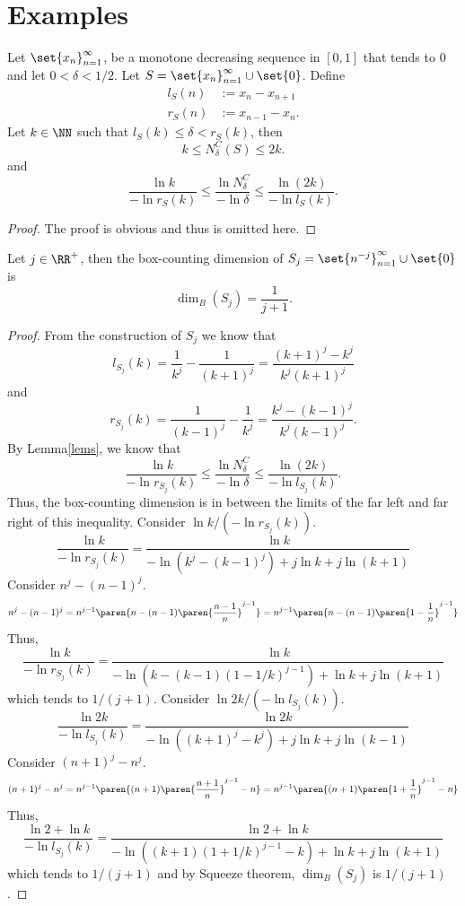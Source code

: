 \section{Examples}

\begin{lemma}\label{lems}
	Let $\set{x_n}_{n=1}^\infty$, be a monotone decreasing sequence in $[0,1]$ that tends to 0 and let $0 < \delta < 1/2$.
	Let $S=\set{x_n}_{n=1}^\infty\cup\set{0}$.
	Define
	\begin{align*}
		l_S(n)&:= x_n-x_{n+1}\\
		r_S(n)&:= x_{n-1}-x_n.
	\end{align*}
	Let $k\in\NN$ such that $l_S(k)\leq \delta < r_S(k)$, then
	\[
		k \leq N^C_\delta(S)\leq 2k.
	\]
	and
	\[
		\frac{\ln k}{-\ln r_S(k)}\leq \frac{\ln N^C_\delta}{-\ln\delta}\leq\frac{\ln (2k)}{-\ln l_S(k)}.
	\]
\end{lemma}
\begin{proof}
	The proof is obvious and thus is omitted here.
\end{proof}

\begin{example}
	Let $j\in\RR^+$, then the box-counting dimension of $S_j=\set{n^{-j}}_{n=1}^\infty\cup\set{0}$ is
	\[
		\dim_B(S_j)=\frac{1}{j+1}.
	\]
\end{example}
\begin{proof}
	From the construction of $S_j$ we know that
	\[
		l_{S_j}(k) = \frac{1}{k^j}-\frac{1}{(k+1)^j} = \frac{(k+1)^j-k^j}{k^j(k+1)^j}
	\]
	and
	\[
		r_{S_j}(k) = \frac{1}{(k-1)^j}-\frac{1}{k^j} = \frac{k^j-(k-1)^j}{k^j(k-1)^j}.
	\]
	By Lemma\autoref{lems}, we know that
	\[
		\frac{\ln k}{-\ln r_{S_j}(k)}\leq \frac{\ln N^C_\delta}{-\ln\delta}\leq\frac{\ln (2k)}{-\ln l_{S_j}(k)}.
	\]
	Thus, the box-counting dimension is in between the limits of the far left and far right of this inequality.
	Consider $\ln k/(-\ln r_{S_j}(k))$.
	\[
		\frac{\ln k}{-\ln r_{S_j}(k)}=\frac{\ln k}{-\ln (k^j-(k-1)^j)+j\ln k +j\ln(k+1)}
	\]
	Consider $n^j-(n-1)^j$.
	\[
		n^j-(n-1)^j=n^{j-1}\paren{ n - (n-1)\paren{\frac{n-1}{n}}^{j-1} }=n^{j-1}\paren{ n - (n-1)\paren{1-\frac{1}{n}}^{j-1} }
	\]
	Thus,
	\[
		\frac{\ln k}{-\ln r_{S_j}(k)}=\frac{\ln k}{-\ln(k-(k-1)(1-1/k)^{j-1})+\ln k +j\ln(k+1)}
	\]
	which tends to $1/(j+1)$.
	Consider $\ln 2k/(-\ln l_{S_j}(k))$.
	\[
		\frac{\ln 2k}{-\ln l_{S_j}(k)}=\frac{\ln 2k}{-\ln ((k+1)^j-k^j)+j\ln k +j\ln(k-1)}
	\]
	Consider $(n+1)^j-n^j$.
	\[
		(n+1)^j-n^j=n^{j-1}\paren{ (n+1)\paren{\frac{n+1}{n}}^{j-1} - n }=n^{j-1}\paren{ (n+1)\paren{1+\frac{1}{n}}^{j-1} - n }
	\]
	Thus,
	\[
		\frac{\ln 2 +\ln k}{-\ln l_{S_j}(k)}=\frac{\ln 2+\ln k}{-\ln((k+1)(1+1/k)^{j-1}-k)+\ln k +j\ln(k+1)}
	\]
	which tends to $1/(j+1)$ and by Squeeze theorem, $\dim_B(S_j)$ is $1/(j+1)$.
\end{proof}

